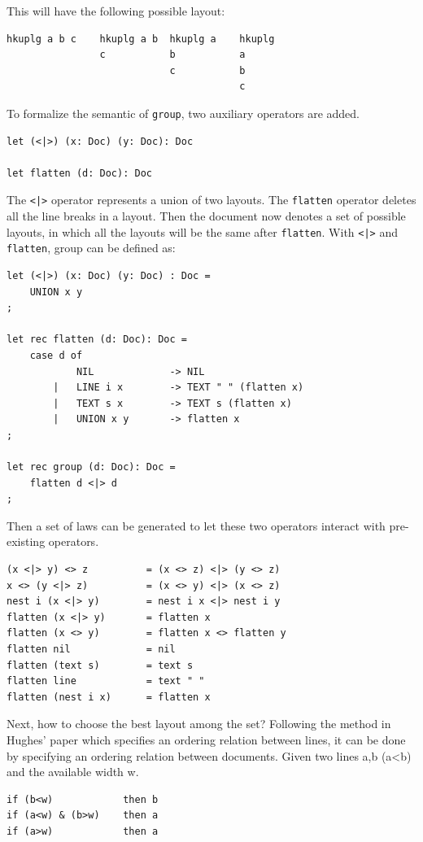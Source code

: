 This will have the following possible layout:
\begin{lstlisting}[language=Haskell]
hkuplg a b c    hkuplg a b  hkuplg a    hkuplg
                c           b           a
                            c           b
                                        c
\end{lstlisting}

To formalize the semantic of \texttt{group}, two auxiliary operators are added.
\begin{lstlisting}
let (<|>) (x: Doc) (y: Doc): Doc

let flatten (d: Doc): Doc
\end{lstlisting}

The \texttt{<|>} operator represents a union of two layouts. The \texttt{flatten} operator deletes all the line breaks in a layout. Then the document now denotes a set of possible layouts, in which all the layouts will be the same after \texttt{flatten}. With \texttt{<|>} and \texttt{flatten}, group can be defined as:
\begin{lstlisting}
let (<|>) (x: Doc) (y: Doc) : Doc =
    UNION x y
;

let rec flatten (d: Doc): Doc =
    case d of
            NIL             -> NIL
        |   LINE i x        -> TEXT " " (flatten x)
        |   TEXT s x        -> TEXT s (flatten x)
        |   UNION x y       -> flatten x
;

let rec group (d: Doc): Doc =
    flatten d <|> d
;
\end{lstlisting}

Then a set of laws can be generated to let these two operators interact with pre-existing operators.
\begin{lstlisting}
(x <|> y) <> z          = (x <> z) <|> (y <> z)
x <> (y <|> z)          = (x <> y) <|> (x <> z)
nest i (x <|> y)        = nest i x <|> nest i y
flatten (x <|> y)       = flatten x
flatten (x <> y)        = flatten x <> flatten y
flatten nil             = nil
flatten (text s)        = text s
flatten line            = text " "
flatten (nest i x)      = flatten x
\end{lstlisting}

Next, how to choose the best layout among the set? Following the method in Hughes' paper \cite{hughes1995design} which specifies an ordering relation between lines, it can be done by specifying an ordering relation between documents. Given two lines a,b (a<b) and the available width w.
\begin{lstlisting}
if (b<w)            then b
if (a<w) & (b>w)    then a
if (a>w)            then a
\end{lstlisting}

